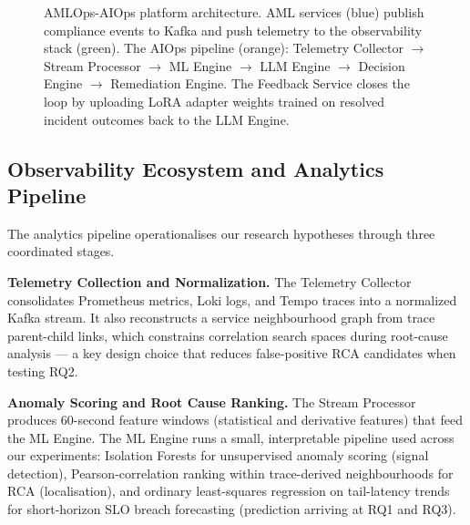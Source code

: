 \documentclass[a4paper]{lipics-v2021}
\newcommand{\mypara}[1]{{\vspace{0.1mm}\noindent\textbf{#1}}}
\begin{document}
\begin{figure}[t]
{%
}
\caption{AMLOps-AIOps platform architecture. AML services (blue) publish compliance
events to Kafka and push telemetry to the observability stack (green). The AIOps
pipeline (orange): Telemetry Collector $\to$ Stream Processor $\to$ ML Engine $\to$
LLM Engine $\to$ Decision Engine $\to$ Remediation Engine. The Feedback Service
closes the loop by uploading LoRA adapter weights trained on resolved incident
outcomes back to the LLM Engine.}
\label{fig:architecture}
\end{figure}


\subsection{Observability Ecosystem and Analytics Pipeline}

The analytics pipeline operationalises our research hypotheses through three
coordinated stages.

\mypara{Telemetry Collection and Normalization.}
The Telemetry Collector consolidates Prometheus metrics, Loki logs, and Tempo
traces into a normalized Kafka stream. It also reconstructs a service
neighbourhood graph from trace parent-child links, which constrains correlation
search spaces during root-cause analysis — a key design choice that reduces
false-positive RCA candidates when testing RQ2.

\mypara{Anomaly Scoring and Root Cause Ranking.}
The Stream Processor produces 60-second feature windows (statistical and
derivative features) that feed the ML Engine. The ML Engine runs a small,
interpretable pipeline used across our experiments: Isolation Forests for
unsupervised anomaly scoring (signal detection), Pearson-correlation ranking
within trace-derived neighbourhoods for RCA (localisation), and ordinary
least-squares regression on tail-latency trends for short-horizon SLO breach
forecasting (prediction arriving at RQ1 and RQ3).
\end{document}
